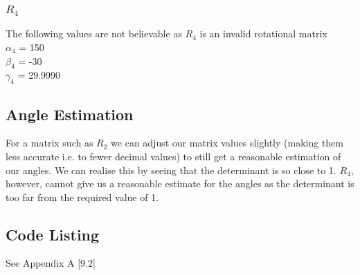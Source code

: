 		\subsubsection{$R_{4}$}
		The following values are not believable as $R_{4}$ is an invalid rotational matrix\\
			$\alpha_{4}$ = 150\degree\\
			$\beta_{4}$ = -30\degree\\
			$\gamma_{4}$ = 29.9990\degree\\
	\subsection{Angle Estimation}
	For a matrix such as $R_{2}$ we can adjust our matrix values slightly (making them less accurate i.e. to fewer decimal values) to still get a reasonable estimation of our angles. We can realise this by seeing that the determinant is so close to 1.
	$R_{4}$, however, cannot give us a reasonable estimate for the angles as the determinant is too far from the required value of 1.
	
	\subsection*{Code Listing}
	See Appendix A [9.2]